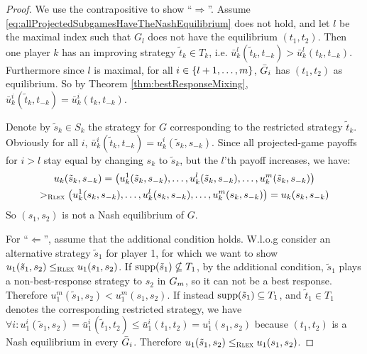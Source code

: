 \documentclass[a4paper]{scrreprt}
\begin{document}
    \begin{proof}
        We use the contrapositive to show “$\Rightarrow$”. Assume \eqref{eq:allProjectedSubgamesHaveTheNashEquilibrium} does not hold, and let $l$ be the maximal index such that $G_l$ does not have the equilibrium $(t_1, t_2)$.
        Then one player $k$ has an improving strategy $\tilde{t}_k \in T_k$, i.e.
        $\bar{u}_k^l(\tilde{t}_k, t_{-k}) > \bar{u}_k^l(t_k, t_{-k})$.
        Furthermore since $l$ is maximal, for all $i \in \{l+1, \dots, m\}$, $\bar{G}_{i}$ has $(t_1, t_2)$ as equilibrium.
        So by Theorem \ref{thm:bestResponseMixing}, $\bar{u}_k^i(\tilde{t}_k, t_{-k}) = \bar{u}_k^i(t_k, t_{-k})$.
        
        Denote by $\tilde{s}_k \in S_k$ the strategy for $G$ corresponding to the restricted strategy $\tilde{t}_k$.
        Obviously for all $i$, $\bar{u}_k^i(\tilde{t}_k, t_{-k}) = u_k^i(\tilde{s}_k, s_{-k})$.
        Since all projected-game payoffs for $i > l$ stay equal by changing $s_k$ to $\tilde{s}_k$, but the $l$'th payoff increases, we have:
        \begin{multline*}
                         u_k(\tilde{s}_k, s_{-k}) 
                       = \bigl(u_k^{1}(\tilde{s}_k, s_{-k}), \dots, u_k^l(\tilde{s}_k, s_{-k}), \dots, u_k^{m}(\tilde{s}_k, s_{-k})\bigr) \\
            >_{\textsc{Rlex}} \bigl(u_k^{1}(s_k, s_{-k}), \dots, u_k^l(s_k, s_{-k}), \dots, u_k^{m}(s_k, s_{-k})\bigr)
                       = u_k(s_k, s_{-k}) 
        \end{multline*}
        So $(s_1, s_2)$ is not a Nash equilibrium of $G$.
        
        For “$\Leftarrow$”, assume that the additional condition holds.
        W.l.o.g consider an alternative strategy $\tilde{s}_1$ for player 1, for which we want to show $u_1(\tilde{s}_1, s_2) \leq_{\textsc{Rlex}} u_1(s_1, s_2)$.
        If $\operatorname{supp} (\tilde{s}_1) \nsubseteq T_1$, by the additional condition, $\tilde{s}_1$ plays a non-best-response strategy to $s_2$ in $G_{m}$, so it can not be a best response. Therefore $u_1^m(\tilde{s}_1, s_2) < u_1^m(s_1, s_2)$.
        If instead $\operatorname{supp} (\tilde{s}_1) \subseteq T_1$, and $\tilde{t}_1 \in T_1$ denotes the corresponding restricted strategy,
        we have $\forall i: u_1^i(\tilde{s}_1, s_2) = \bar{u}_1^i(\tilde{t}_1, t_2) \leq \bar{u}_1^i(t_1, t_2) = u_1^i(s_1, s_2)$ because $(t_1, t_2)$ is a Nash equilibrium in every $\bar{G}_{i}$. Therefore $u_1(\tilde{s}_1, s_2) \leq_{\textsc{Rlex}} u_1(s_1, s_2)$.
    \end{proof}
\end{document}
